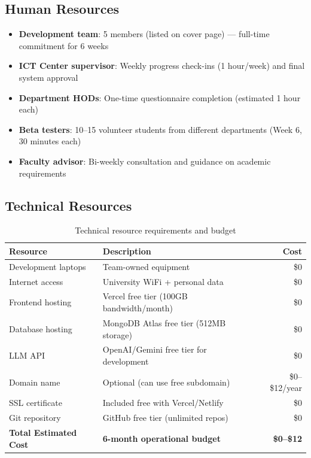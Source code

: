 \documentclass[12pt, a4paper]{article}
\begin{document}
\subsection{Human Resources}
\begin{itemize}[leftmargin=1.5em, itemsep=3pt]
\item \textbf{Development team}: 5 members (listed on cover page) — full-time commitment for 6 weeks
\item \textbf{ICT Center supervisor}: Weekly progress check-ins (1 hour/week) and final system approval
\item \textbf{Department HODs}: One-time questionnaire completion (estimated 1 hour each)
\item \textbf{Beta testers}: 10–15 volunteer students from different departments (Week 6, 30 minutes each)
\item \textbf{Faculty advisor}: Bi-weekly consultation and guidance on academic requirements
\end{itemize}

\subsection{Technical Resources}

\begin{table}[H]
\centering
\begin{tabularx}{0.9\textwidth}{lXr}
\toprule
\textbf{Resource} & \textbf{Description} & \textbf{Cost} \\
\midrule
Development laptops & Team-owned equipment & \$0 \\[2pt]
Internet access & University WiFi + personal data & \$0 \\[2pt]
Frontend hosting & Vercel free tier (100GB bandwidth/month) & \$0 \\[2pt]
Database hosting & MongoDB Atlas free tier (512MB storage) & \$0 \\[2pt]
LLM API & OpenAI/Gemini free tier for development & \$0 \\[2pt]
Domain name & Optional (can use free subdomain) & \$0–\$12/year \\[2pt]
SSL certificate & Included free with Vercel/Netlify & \$0 \\[2pt]
Git repository & GitHub free tier (unlimited repos) & \$0 \\[2pt]
\midrule
\textbf{Total Estimated Cost} & \textbf{6-month operational budget} & \textbf{\$0–\$12} \\
\bottomrule
\end{tabularx}
\caption{Technical resource requirements and budget}
\end{table}
\end{document}
